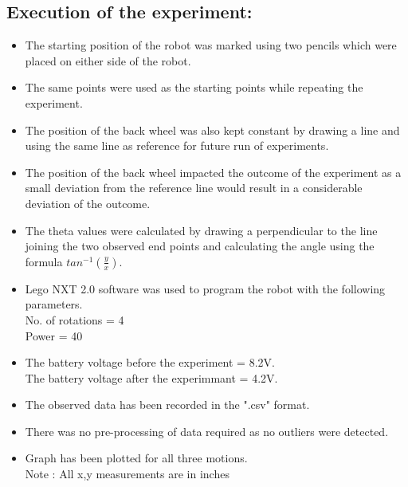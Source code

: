 \documentclass[11pt,a4paper]{article}
\begin{document}
\subsection{Execution of the experiment:}
\begin{itemize}
\item The starting position of the robot was marked using two pencils which were placed on either side of the robot.
\item The same points were used as the starting points while repeating the experiment.
\item The position of the back wheel was also kept constant by drawing a line and using the same line as reference for future run of experiments.
\item The position of the back wheel impacted the outcome of the experiment as a small deviation from the reference line would result in a considerable deviation of the outcome.
\item The theta values were calculated by drawing a perpendicular to the line joining the two observed end points and calculating the angle using the formula $tan^{-1}(\frac{y}{x})$.
\item Lego NXT 2.0 software was used to program the robot with the following parameters.\\
No. of rotations = 4\\ 
Power = 40
\item {The battery voltage before the experiment = 8.2V. \\ The battery voltage after the experimmant = 4.2V.}
\item The observed data has been recorded in the ".csv" format.
\item There was no pre-processing of data required as no outliers were detected.
\item Graph has been plotted for all three motions. \\
Note : All x,y measurements are in inches

\end{itemize}
\end{document}
